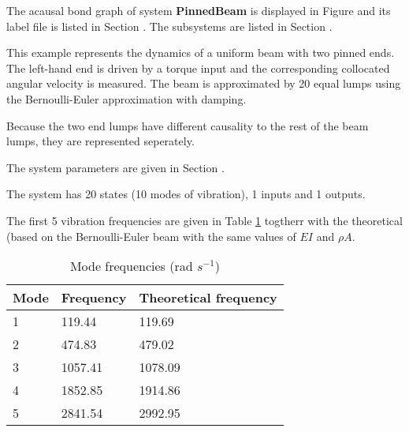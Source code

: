 

The acausal bond graph of system \textbf{PinnedBeam} is displayed in
Figure  and its label file is listed in
Section .  The subsystems are listed in Section
.
   
This example represents the dynamics of a uniform beam with two pinned
ends. The left-hand end is driven by a torque input and the
corresponding collocated angular velocity is measured.  The beam is
approximated by 20 equal lumps using the Bernoulli-Euler approximation
with damping. 

Because the two end lumps have different causality to the rest of the
beam lumps, they are represented seperately.

The system parameters are given in Section
. 

 The system has 20 states (10
modes of vibration), 1 inputs and 1 outputs.

The first 5 vibration frequencies are given in Table \ref{tab:freq}
togtherr with the theoretical (based on the Bernoulli-Euler beam with
the same values of $EI$ and $\rho A$. 
\begin{table}[htbp]
  \begin{center}
    \begin{tabular}{||l|l|l||}
      \hline
      \hline
      Mode & Frequency & Theoretical frequency\\
      \hline
      1 & 119.44 & 119.69\\
      2 & 474.83 & 479.02\\
      3 &1057.41 &1078.09\\
      4 &1852.85 &1914.86\\
      5 &2841.54 &2992.95\\
      \hline
      \hline
    \end{tabular}
    \caption{Mode frequencies (rad $s^{-1}$)}
    \label{tab:freq}
  \end{center}
\end{table}





